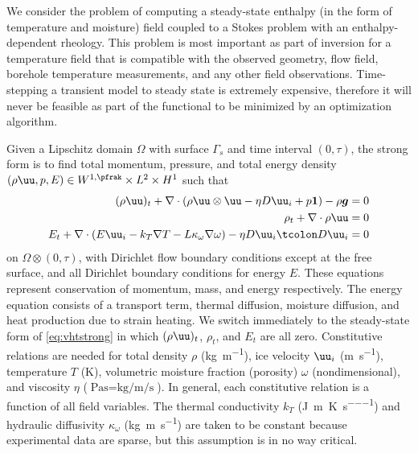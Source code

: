 We consider the problem of computing a steady-state enthalpy (in the form of temperature and moisture) field coupled to a Stokes problem with an enthalpy-dependent rheology.
This problem is most important as part of inversion for a temperature field that is compatible with the observed geometry, flow field, borehole temperature measurements, and any other field observations.
Time-stepping a transient model to steady state is extremely expensive, therefore it will never be feasible as part of the functional to be minimized by an optimization algorithm.

Given a Lipschitz domain $\Omega$ with surface $\Gamma_s$ and time interval $(0,\tau)$, the strong form is to find total momentum, pressure, and total energy density $(\rho\uu,p,E) \in W^{1,\pfrak} \times L^2 \times H^1$ such that
\begin{subequations}\label{eq:vhtstrong}
  \begin{align}
    (\rho\uu)_t + \nabla \cdot(\rho\uu\otimes\uu - \eta D\uu_i + p\bm 1) - \rho \bm g &= 0 \label{eq:vhtstrong:momentum} \\
    \rho_t + \nabla \cdot \rho\uu &= 0 \label{eq:vhtstrong:mass} \\
    E_t + \nabla\cdot (E\uu_i - k_T\nabla T - L \kappa_\omega\nabla\omega) - \eta D\uu_i\tcolon D\uu_i &= 0 \label{eq:vhtstrong:energy}
  \end{align}
\end{subequations}
on $\Omega\otimes (0,\tau)$, with Dirichlet flow boundary conditions except at the free surface, and all Dirichlet boundary conditions for energy $E$.
These equations represent conservation of momentum, mass, and energy respectively.
The energy equation consists of a transport term, thermal diffusion, moisture diffusion, and heat production due to strain heating.
We switch immediately to the steady-state form of \eqref{eq:vhtstrong} in which $(\rho\uu)_t$, $\rho_t$, and $E_t$ are all zero.
Constitutive relations are needed for total density $\rho$ (\si{\kilogram\per\metre}), ice velocity $\uu_i$ (\si{\metre\per\second}), temperature $T$ (\si{\kelvin}), volumetric moisture fraction (porosity) $\omega$ (nondimensional), and viscosity $\eta$ ($\si{\pascal\second} = \si{\kilogram\per\metre\per\second}$).
In general, each constitutive relation is a function of all field variables.
The thermal conductivity $k_T$ (\si{\joule\per\metre\per\kelvin\per\second}) and hydraulic diffusivity $\kappa_\omega$ (\si{\kilogram\metre\per\second}) are taken to be constant because experimental data are sparse, but this assumption is in no way critical.

